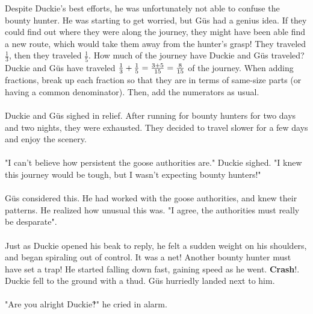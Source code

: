 {Despite Duckie's best efforts, he was unfortunately not able to confuse the bounty hunter. He was starting to get worried, but Güs had a genius idea. If they could find out where they were along the journey, they might have been able find a new route, which would take them away from the hunter's grasp! They traveled $\frac{1}{3}$, then they traveled $\frac{1}{5}$. How much of the journey have Duckie and Güs traveled?}
{Duckie and Güs have traveled $\frac{1}{3}+\frac{1}{5}\linebreak=\frac{3+5}{15}\linebreak=\frac{8}{15}$ of the journey.}
{When adding fractions, break up each fraction so that they are in terms of same-size parts (or having a common denominator). Then, add the numerators as usual.}
{}
\paragraph{} Duckie and Güs sighed in relief. After running for bounty hunters for two days and two nights, they were exhausted. They decided to travel slower for a few days and enjoy the scenery. 
\paragraph{} "I can't believe how persistent the goose authorities are." Duckie sighed. "I knew this journey would be tough, but I wasn't expecting bounty hunters!"
\paragraph{} Güs considered this. He had worked with the goose authorities, and knew their patterns. He realized how unusual this was. "I agree, the authorities must really be desparate".
\paragraph{} Just as Duckie opened his beak to reply, he felt a sudden weight on his shoulders, and began spiraling out of control. It was a net! Another bounty hunter must have set a trap! He started falling down fast, gaining speed as he went. \textbf{Crash}!. Duckie fell to the ground with a thud. Güs hurriedly landed next to him. 
\paragraph{} "Are you alright Duckie‽" he cried in alarm.
